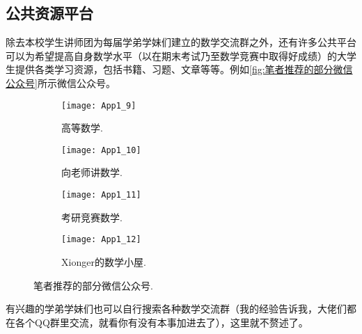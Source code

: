   \subsection{公共资源平台}
    \hspace*{2em}除去本校学生讲师团为每届学弟学妹们建立的数学交流群之外，还有许多公共平台可以为希望提高自身数学水平（以在期末考试乃至数学竞赛中取得好成绩）的大学生提供各类学习资源，包括书籍、习题、文章等等。例如\autoref{fig:笔者推荐的部分微信公众号}所示微信公众号。
    \begin{figure}[!htb]
    \centering
    \hfill
    \begin{subfigure}[b]{.23\textwidth}
      \centering
      \texttt{[image: App1\_9]}
      \caption{高等数学.}
    \end{subfigure}
    \hfill
    \begin{subfigure}[b]{.23\textwidth}
      \centering
      \texttt{[image: App1\_10]}
      \caption{向老师讲数学.}
    \end{subfigure}
    \hfill
    \begin{subfigure}[b]{.23\textwidth}
      \centering
      \texttt{[image: App1\_11]}
      \caption{考研竞赛数学.}
    \end{subfigure}
    \hfill
    \begin{subfigure}[b]{.23\textwidth}
      \centering
      \texttt{[image: App1\_12]}
      \caption{Xionger的数学小屋.}
    \end{subfigure}
    \caption{笔者推荐的部分微信公众号.}\label{fig:笔者推荐的部分微信公众号}
    \end{figure}

    \hspace*{2em}有兴趣的学弟学妹们也可以自行搜索各种数学交流群（我的经验告诉我，大佬们都在各个QQ群里交流，就看你有没有本事加进去了），这里就不赘述了。
